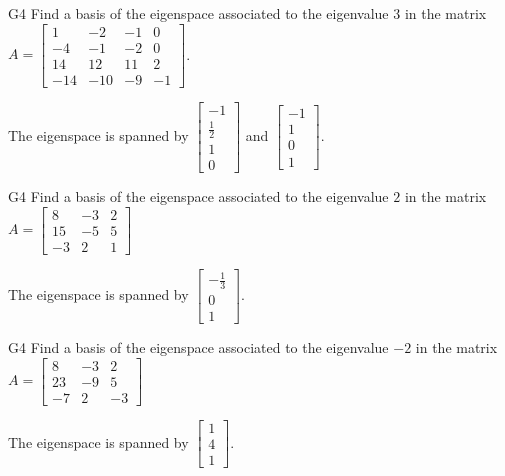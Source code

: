 \begin{problem}{G4}
Find a basis of the eigenspace associated to the eigenvalue $3$ in the matrix $A=\begin{bmatrix}1 & -2 & -1 & 0 \\ -4 & -1 & -2 & 0 \\ 14 & 12 & 11 & 2 \\ -14 & -10 & -9 & -1\end{bmatrix}$.
\end{problem}
\begin{solution}
The eigenspace is spanned by $\begin{bmatrix} -1 \\ \frac{1}{2} \\ 1 \\ 0 \end{bmatrix}$ and  $\begin{bmatrix} -1 \\ 1 \\ 0 \\ 1 \end{bmatrix}$.
\end{solution}


\begin{problem}{G4}
Find a basis of the eigenspace associated to the eigenvalue $2$ in the matrix $A=\begin{bmatrix}8 & -3 & 2 \\ 15 & -5 & 5 \\ -3 & 2 & 1\end{bmatrix}$
\end{problem}
\begin{solution}
The eigenspace is spanned by $\begin{bmatrix} -\frac{1}{3} \\ 0 \\ 1 \end{bmatrix}$.
\end{solution}

\begin{problem}{G4}
Find a basis of the eigenspace associated to the eigenvalue $-2$ in the matrix $A=\begin{bmatrix}8 & -3 & 2 \\ 23 & -9 & 5 \\ -7 & 2 & -3\end{bmatrix}$
\end{problem}
\begin{solution}
The eigenspace is spanned by $\begin{bmatrix} 1 \\ 4 \\ 1 \end{bmatrix}$.
\end{solution}

